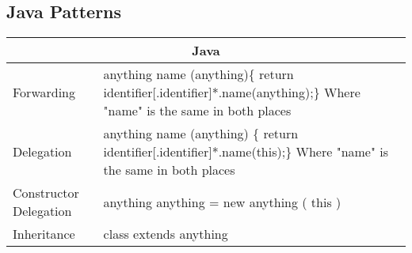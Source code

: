 \subsection{Java Patterns}
\begin{tabular}{|p{5cm}|p{9cm}|}
	\hline
	\multicolumn{2}{|c|}{Java}                                                                                                                                               \\ \hline
	Forwarding                     & anything name (anything)\{ \newline   return identifier{[}.identifier{]}*.name(anything);\newline \} \newline Where "name" is the same in both places \\ \hline
	Delegation                     & anything name (anything) \{ \newline   return identifier{[}.identifier{]}*.name(this);\newline \}  \newline Where "name" is the same in both places                    \\ \hline
	Constructor Delegation & anything anything = new anything ( this )                                                                                                  \\ \hline
	Inheritance                    & class extends anything                                                                                                                                         \\ \hline
\end{tabular}

